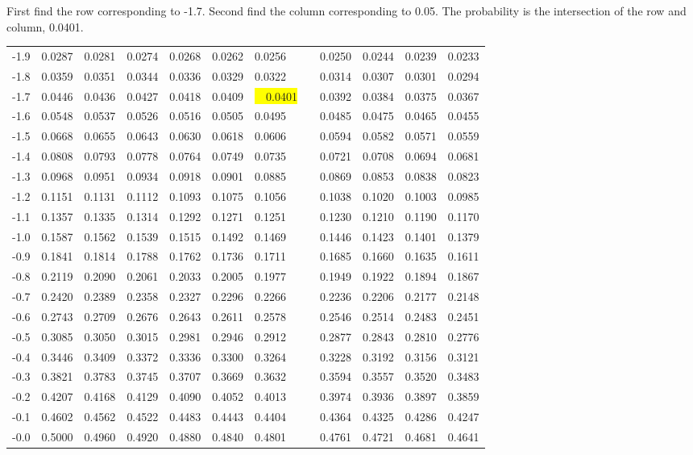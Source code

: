 \begin{frame} {\small First find the row corresponding to -1.7. Second
    find the column corresponding to 0.05. The probability is the
    intersection of the row and column, 0.0401.}
{\begin{tabular}{l|lllll>{\columncolor{light-blue}}lllll}
-1.9 & 0.0287 & 0.0281 & 0.0274 & 0.0268 & 0.0262 & 0.0256 & 0.0250 & 0.0244 & 0.0239 & 0.0233 \\ 
-1.8 & 0.0359 & 0.0351 & 0.0344 & 0.0336 & 0.0329 & 0.0322 & 0.0314 & 0.0307 & 0.0301 & 0.0294 \\ 
\rowcolor{light-red} -1.7 & 0.0446 & 0.0436 & 0.0427 & 0.0418 & 0.0409 & {\colorbox{yellow}{~~0.0401}~~} & 0.0392 & 0.0384 & 0.0375 & 0.0367 \\ 
-1.6 & 0.0548 & 0.0537 & 0.0526 & 0.0516 & 0.0505 & 0.0495 & 0.0485 & 0.0475 & 0.0465 & 0.0455 \\ 
-1.5 & 0.0668 & 0.0655 & 0.0643 & 0.0630 & 0.0618 & 0.0606 & 0.0594 & 0.0582 & 0.0571 & 0.0559 \\ 
-1.4 & 0.0808 & 0.0793 & 0.0778 & 0.0764 & 0.0749 & 0.0735 & 0.0721 & 0.0708 & 0.0694 & 0.0681 \\ 
-1.3 & 0.0968 & 0.0951 & 0.0934 & 0.0918 & 0.0901 & 0.0885 & 0.0869 & 0.0853 & 0.0838 & 0.0823 \\ 
-1.2 & 0.1151 & 0.1131 & 0.1112 & 0.1093 & 0.1075 & 0.1056 & 0.1038 & 0.1020 & 0.1003 & 0.0985 \\ 
-1.1 & 0.1357 & 0.1335 & 0.1314 & 0.1292 & 0.1271 & 0.1251 & 0.1230 & 0.1210 & 0.1190 & 0.1170 \\ 
-1.0 & 0.1587 & 0.1562 & 0.1539 & 0.1515 & 0.1492 & 0.1469 & 0.1446 & 0.1423 & 0.1401 & 0.1379 \\ 
-0.9 & 0.1841 & 0.1814 & 0.1788 & 0.1762 & 0.1736 & 0.1711 & 0.1685 & 0.1660 & 0.1635 & 0.1611 \\ 
-0.8 & 0.2119 & 0.2090 & 0.2061 & 0.2033 & 0.2005 & 0.1977 & 0.1949 & 0.1922 & 0.1894 & 0.1867 \\ 
-0.7 & 0.2420 & 0.2389 & 0.2358 & 0.2327 & 0.2296 & 0.2266 & 0.2236 & 0.2206 & 0.2177 & 0.2148 \\ 
-0.6 & 0.2743 & 0.2709 & 0.2676 & 0.2643 & 0.2611 & 0.2578 & 0.2546 & 0.2514 & 0.2483 & 0.2451 \\ 
-0.5 & 0.3085 & 0.3050 & 0.3015 & 0.2981 & 0.2946 & 0.2912 & 0.2877 & 0.2843 & 0.2810 & 0.2776 \\ 
-0.4 & 0.3446 & 0.3409 & 0.3372 & 0.3336 & 0.3300 & 0.3264 & 0.3228 & 0.3192 & 0.3156 & 0.3121 \\ 
-0.3 & 0.3821 & 0.3783 & 0.3745 & 0.3707 & 0.3669 & 0.3632 & 0.3594 & 0.3557 & 0.3520 & 0.3483 \\ 
-0.2 & 0.4207 & 0.4168 & 0.4129 & 0.4090 & 0.4052 & 0.4013 & 0.3974 & 0.3936 & 0.3897 & 0.3859 \\ 
-0.1 & 0.4602 & 0.4562 & 0.4522 & 0.4483 & 0.4443 & 0.4404 & 0.4364 & 0.4325 & 0.4286 & 0.4247 \\ 
-0.0 & 0.5000 & 0.4960 & 0.4920 & 0.4880 & 0.4840 & 0.4801 & 0.4761 & 0.4721 & 0.4681 & 0.4641 
\end{tabular}



}

\end{frame}




